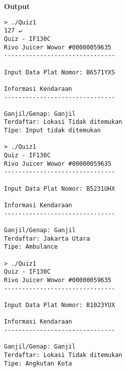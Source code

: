 \documentclass[a4paper, 10pt]{article}
\begin{document}
    \vspace{0.5cm}
        \large \textbf{Output}
        \begin{lstlisting}[style=output]
> ./Quiz1                                                                                      127 ↵
Quiz - IF130C
Rivo Juicer Wowor #00000059635
-------------------------------

Input Data Plat Nomor: B6571YXS

Informasi Kendaraan
-------------------------------

Ganjil/Genap: Ganjil
Terdaftar: Lokasi Tidak ditemukan
Tipe: Input tidak ditemukan

> ./Quiz1
Quiz - IF130C
Rivo Juicer Wowor #00000059635
-------------------------------

Input Data Plat Nomor: B5231UHX

Informasi Kendaraan
-------------------------------

Ganjil/Genap: Ganjil
Terdaftar: Jakarta Utara
Tipe: Ambulance

> ./Quiz1
Quiz - IF130C
Rivo Juicer Wowor #00000059635
-------------------------------

Input Data Plat Nomor: B1023YUX

Informasi Kendaraan
-------------------------------

Ganjil/Genap: Ganjil
Terdaftar: Lokasi Tidak ditemukan
Tipe: Angkutan Kota
        \end{lstlisting}
    

        
\end{document}
